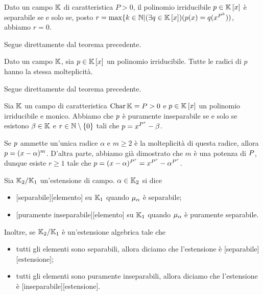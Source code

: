 \begin{Corollary}
	Dato un campo $\mathbb{K}$ di caratteristica $P > 0$, il polinomio irriducibile $p \in \mathbb{K} \left [ x \right ]$ \`e separabile se e solo se, posto $r = \max \lbrace k \in \mathbb{N} | (\exists q \in \mathbb{K} \left [ x \right ])(p(x) = q(x^{P^k}))$, abbiamo $r = 0$.
\end{Corollary}
\Proof Segue direttamente dal teorema precedente. \EndProof
\begin{Corollary}
	Dato un campo $\mathbb{K}$, sia $p \in \mathbb{K} \left [ x \right ]$ un polinomio irriducibile. Tutte le radici di $p$ hanno la stessa molteplicit\`a.
\end{Corollary}
\Proof Segue direttamente dal teorema precedente. \EndProof
\begin{Theorem}
	Sia $\mathbb{K}$ un campo di caratteristica $\operatorname{Char}{\mathbb{K}} = P > 0$ e $p \in \mathbb{K} \left [ x \right ]$ un polinomio irriducibile e monico. Abbiamo che $p$ \`e puramente inseparabile se e solo se esistono $\beta \in \mathbb{K}$ e $r \in \mathbb{N} \setminus \lbrace 0 \rbrace$ tali che $p = x^{P^r} - \beta$.
\end{Theorem}
\Proof Se $p$ ammette un'unica radice $\alpha$ e $m \geq 2$ \`e la molteplicit\`a di questa radice, allora $p = (x - \alpha)^m$. D'altra parte, abbiamo gi\`a dimostrato che $m$ \`e una potenza di $P$, dunque esiste $r \geq 1$ tale che $p = (x - \alpha)^{P^r} = x^{P^r} - \alpha^{P^r}$. \EndProof
\begin{Definition}
	Sia $\mathbb{K}_2/\mathbb{K}_1$ un'estensione di campo. $\alpha \in \mathbb{K}_2$ si dice
	\begin{itemize}
		\item {}[separabile][elemento] su $\mathbb{K}_1$ quando $\MinimalPolynomial{\alpha}$ \`e separabile;
		\item {}[puramente inseparabile][elemento] su $\mathbb{K}_1$ quando $\MinimalPolynomial{\alpha}$ \`e puramente separabile.
	\end{itemize}
	Inoltre, se $\mathbb{K}_2/\mathbb{K}_1$ \`e un'estensione algebrica tale che
	\begin{itemize}
		\item tutti gli elementi sono separabili, allora diciamo che l'estensione \`e [separabile][estensione];
		\item tutti gli elementi sono puramente inseparabili, allora diciamo che l'estensione \`e [inseparabile][estensione].
	\end{itemize}
\end{Definition}
